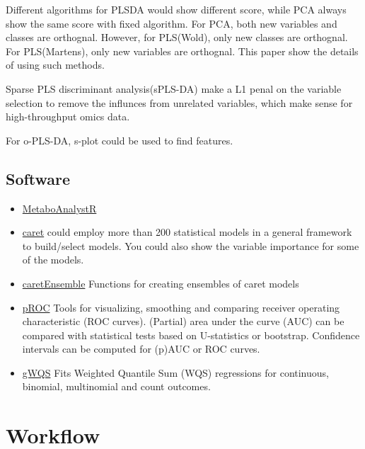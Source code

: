 \documentclass[
]{book}
\begin{document}
Different algorithms\citep{andersson2009} for PLSDA would show different score, while PCA always show the same score with fixed algorithm. For PCA, both new variables and classes are orthognal. However, for PLS(Wold), only new classes are orthognal. For PLS(Martens), only new variables are orthognal. This paper show the details of using such methods\citep{brereton2018}.

Sparse PLS discriminant analysis(sPLS-DA) make a L1 penal on the variable selection to remove the influnces from unrelated variables, which make sense for high-throughput omics data\citep{lecao2011}.

For o-PLS-DA, s-plot could be used to find features.\citep{wiklund2008}

\hypertarget{software-4}{%
\section{Software}\label{software-4}}

\begin{itemize}
\item
  \href{https://github.com/xia-lab/MetaboAnalystR}{MetaboAnalystR} \citep{chong2019}
\item
  \href{http://caret.r-forge.r-project.org/}{caret} could employ more than 200 statistical models in a general framework to build/select models. You could also show the variable importance for some of the models.
\item
  \href{https://cran.r-project.org/web/packages/caretEnsemble/index.html}{caretEnsemble} Functions for creating ensembles of caret models
\item
  \href{https://cran.r-project.org/web/packages/pROC/index.html}{pROC} Tools for visualizing, smoothing and comparing receiver operating characteristic (ROC curves). (Partial) area under the curve (AUC) can be compared with statistical tests based on U-statistics or bootstrap. Confidence intervals can be computed for (p)AUC or ROC curves.
\item
  \href{https://cran.r-project.org/web/packages/gWQS/index.html}{gWQS} Fits Weighted Quantile Sum (WQS) regressions for continuous, binomial, multinomial and count outcomes.
\end{itemize}

\hypertarget{workflow-2}{%
\chapter{Workflow}\label{workflow-2}}
\end{document}
